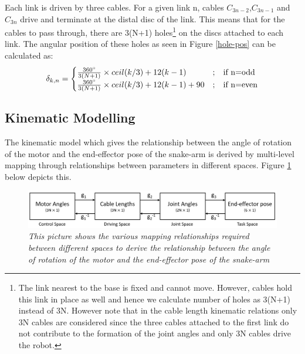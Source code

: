 \documentclass[a4paper,12pt]{report}
\begin{document}
 Each link is driven by three cables. For a given link n, cables $C_{3n-2}$,$C_{3n-1}$ and $C_{3n}$ drive and terminate at the distal disc of the link. This means that for the cables to pass through, there are 3(N+1) holes\footnote{The link nearest to the base is fixed and cannot move. However, cables hold this link in place as well and hence we calculate number of holes as 3(N+1) instead of 3N. However note that in the cable length kinematic relations only 3N cables are considered since the three cables attached to the first link do not contribute to the formation of the joint angles and only 3N cables drive the robot.} on the discs attached to each link. The angular position of these holes as seen in Figure \ref{hole-pos} can be calculated as:
\begin{equation}
\delta_{k,n} =
\begin{cases}
\frac{360^{\circ}}{3(N+1)} \times ceil(k/3) +12(k-1) &; \hspace{3mm}  \text{if n=odd}   \\
\frac{360^{\circ}}{3(N+1)} \times ceil(k/3) +12(k-1) + 90 &; \hspace{3mm}  \text{if n=even}
\end{cases}
\end{equation}


\subsection{Kinematic Modelling}
The kinematic model which gives the relationship between the angle of rotation of the motor and the end-effector pose of the snake-arm is derived by multi-level mapping through relationships between parameters in different spaces. Figure \ref{kinematic map} below depicts this.
\begin{figure}[h]
	\centering
	\includegraphics[width=\textwidth]{images/Kinematics-mapping.png}
	\caption{\textit{This picture shows the various mapping relationships required between different spaces to derive the relationship between the angle of rotation of the motor and the end-effector pose of the snake-arm}}
	\label{kinematic map}
\end{figure}
 
\end{document}
